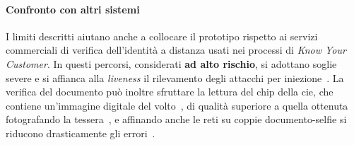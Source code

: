 \paragraph{Confronto con altri sistemi}
I limiti descritti aiutano anche a collocare il prototipo rispetto ai servizi commerciali di verifica dell'identità a distanza usati nei processi di \textit{Know Your Customer}.
In questi percorsi, considerati \textbf{ad alto rischio}, si adottano soglie severe e si affianca alla \textit{liveness} il rilevamento degli attacchi per iniezione~\cite{groupBiometricLivenessPresentation}.
La verifica del documento può inoltre sfruttare la lettura del chip della \gls{cie}, che contiene un'immagine digitale del volto~\cite{icao9303}, di qualità superiore a quella ottenuta fotografando la tessera~\cite{albieroIdentityDocumentSelfie2019a}, e affinando anche le reti su coppie documento-selfie si riducono drasticamente gli errori~\cite{shiDocFaceMatchingID2018,albieroIdentityDocumentSelfie2019a}.

